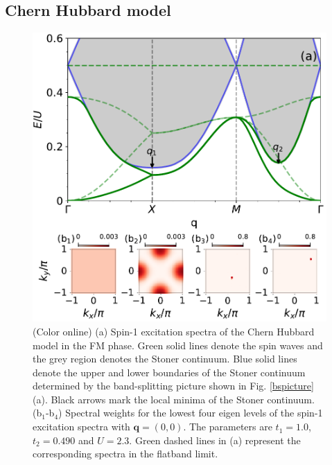 \documentclass[amsmath,superscriptaddress,showpacs,aps,prb,twocolumn]{revtex4-1}
\begin{document}
\subsection{Chern Hubbard model}\label{CHM}
\begin{figure}
\includegraphics[width=\columnwidth]{fmcispectrum}
\caption{(Color online) (a) Spin-1 excitation spectra of the Chern Hubbard model in the FM phase. Green solid lines denote the spin waves and the grey region denotes the Stoner continuum. Blue solid lines denote the upper and lower boundaries of the Stoner continuum determined by the band-splitting picture shown in Fig. \ref{bspicture}(a). Black arrows mark the local minima of the Stoner continuum. (b$_1$-b$_4$) Spectral weights for the lowest four eigen levels of the spin-1 excitation spectra with $\mathbf{q}=(0,0)$. The parameters are $t_1=1.0$, $t_2=0.490$ and $U=2.3$. Green dashed lines in (a) represent the corresponding spectra in the flatband limit.}
\label{fmcispectrum}
\end{figure}
\end{document}
